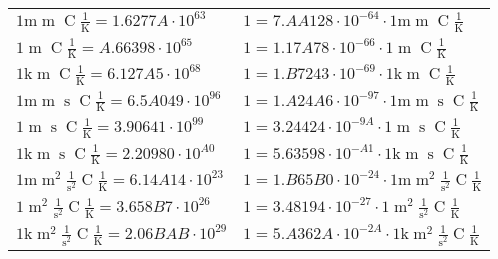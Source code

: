 \begin{center}
\begin{longtable}{l l}
{\color{gray}$1 \bm{\mathrm{ m}}{\operatorname{m}}{}{\operatorname{C}}\frac1{\operatorname{K}} = 1.6277A\cdot10^{63} $}   & {\color{gray}$ 1 = 7.AA128\cdot10^{-64} \cdot 1 \bm{\mathrm{ m}}{\operatorname{m}}{}{\operatorname{C}}\frac1{\operatorname{K}}$}  \\
{\color{black}$1 \bm{\mathrm{ }}{\operatorname{m}}{}{\operatorname{C}}\frac1{\operatorname{K}} = A.66398\cdot10^{65} $}   & {\color{black}$ 1 = 1.17A78\cdot10^{-66} \cdot 1 \bm{\mathrm{ }}{\operatorname{m}}{}{\operatorname{C}}\frac1{\operatorname{K}}$}  \\
{\color{gray}$1 \bm{\mathrm{ k}}{\operatorname{m}}{}{\operatorname{C}}\frac1{\operatorname{K}} = 6.127A5\cdot10^{68} $}   & {\color{gray}$ 1 = 1.B7243\cdot10^{-69} \cdot 1 \bm{\mathrm{ k}}{\operatorname{m}}{}{\operatorname{C}}\frac1{\operatorname{K}}$}  \\
{\color{gray}$1 \bm{\mathrm{ m}}{\operatorname{m}}{\operatorname{s}}{\operatorname{C}}\frac1{\operatorname{K}} = 6.5A049\cdot10^{96} $}   & {\color{gray}$ 1 = 1.A24A6\cdot10^{-97} \cdot 1 \bm{\mathrm{ m}}{\operatorname{m}}{\operatorname{s}}{\operatorname{C}}\frac1{\operatorname{K}}$}  \\
{\color{black}$1 \bm{\mathrm{ }}{\operatorname{m}}{\operatorname{s}}{\operatorname{C}}\frac1{\operatorname{K}} = 3.90641\cdot10^{99} $}   & {\color{black}$ 1 = 3.24424\cdot10^{-9A} \cdot 1 \bm{\mathrm{ }}{\operatorname{m}}{\operatorname{s}}{\operatorname{C}}\frac1{\operatorname{K}}$}  \\
{\color{gray}$1 \bm{\mathrm{ k}}{\operatorname{m}}{\operatorname{s}}{\operatorname{C}}\frac1{\operatorname{K}} = 2.20980\cdot10^{A0} $}   & {\color{gray}$ 1 = 5.63598\cdot10^{-A1} \cdot 1 \bm{\mathrm{ k}}{\operatorname{m}}{\operatorname{s}}{\operatorname{C}}\frac1{\operatorname{K}}$}  \\
{\color{gray}$1 \bm{\mathrm{ m}}{\operatorname{m}^2}\frac1{\operatorname{s}^2}{\operatorname{C}}\frac1{\operatorname{K}} = 6.14A14\cdot10^{23} $}   & {\color{gray}$ 1 = 1.B65B0\cdot10^{-24} \cdot 1 \bm{\mathrm{ m}}{\operatorname{m}^2}\frac1{\operatorname{s}^2}{\operatorname{C}}\frac1{\operatorname{K}}$}  \\
{\color{black}$1 \bm{\mathrm{ }}{\operatorname{m}^2}\frac1{\operatorname{s}^2}{\operatorname{C}}\frac1{\operatorname{K}} = 3.658B7\cdot10^{26} $}   & {\color{black}$ 1 = 3.48194\cdot10^{-27} \cdot 1 \bm{\mathrm{ }}{\operatorname{m}^2}\frac1{\operatorname{s}^2}{\operatorname{C}}\frac1{\operatorname{K}}$}  \\
{\color{gray}$1 \bm{\mathrm{ k}}{\operatorname{m}^2}\frac1{\operatorname{s}^2}{\operatorname{C}}\frac1{\operatorname{K}} = 2.06BAB\cdot10^{29} $}   & {\color{gray}$ 1 = 5.A362A\cdot10^{-2A} \cdot 1 \bm{\mathrm{ k}}{\operatorname{m}^2}\frac1{\operatorname{s}^2}{\operatorname{C}}\frac1{\operatorname{K}}$}  \\

\end{longtable}
\end{center}
